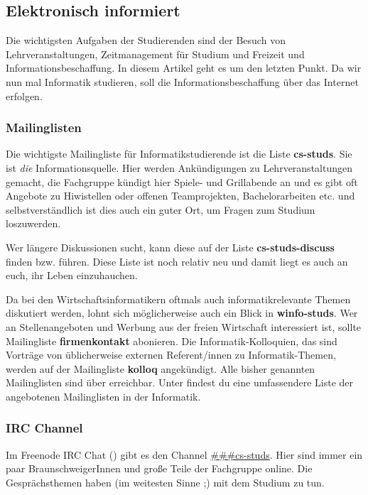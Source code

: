\subsection{Elektronisch informiert}
	\label{elekinf}
	Die wichtigsten Aufgaben der Studierenden sind der Besuch von Lehrveranstaltungen, Zeitmanagement für Studium und Freizeit und Informationsbeschaffung. In diesem Artikel geht es um den letzten Punkt. Da wir nun mal Informatik studieren, soll die Informationsbeschaffung über das Internet erfolgen.

	\subsubsection*{Mailinglisten}
	\label{mailinglisten}
		Die wichtigste Mailingliste für Informatikstudierende ist die Liste \textbf{cs-studs}. Sie ist \emph{die} Informationsquelle. Hier werden Ankündigungen zu Lehrveranstaltungen gemacht, die Fachgruppe kündigt hier Spiele- und Grillabende an und es gibt oft Angebote zu Hiwistellen oder offenen Teamprojekten, Bachelorarbeiten etc. und selbstverständlich ist dies auch ein guter Ort, um Fragen zum Studium loszuwerden.

		Wer längere Diskussionen sucht, kann diese auf der Liste \textbf{cs-studs-discuss} finden bzw. führen. Diese Liste ist noch relativ neu und damit liegt es auch an euch, ihr Leben einzuhauchen.

		Da bei den Wirtschaftsinformatikern oftmals auch informatikrelevante Themen diskutiert werden, lohnt sich möglicherweise auch ein Blick in \textbf{winfo-studs}. 
		Wer an Stellenangeboten und Werbung aus der freien
		Wirtschaft interessiert ist, sollte Mailingliste
		\textbf{firmenkontakt} abonieren. Die
		Informatik-Kolloquien, das sind Vorträge von
		üblicherweise externen Referent/innen zu Informatik-Themen,
		werden auf der Mailingliste \textbf{kolloq} angekündigt.
		Alle bisher genannten Mailinglisten sind über
		erreichbar. Unter
		findest du eine umfassendere Liste der angebotenen Mailinglisten in der Informatik.

	\subsubsection*{IRC Channel}
		Im Freenode IRC Chat () gibt es den Channel \url{###cs-studs}. Hier sind immer ein paar BraunschweigerInnen und große Teile der Fachgruppe online. Die Gesprächsthemen haben (im weitesten Sinne ;) mit dem Studium zu tun.

